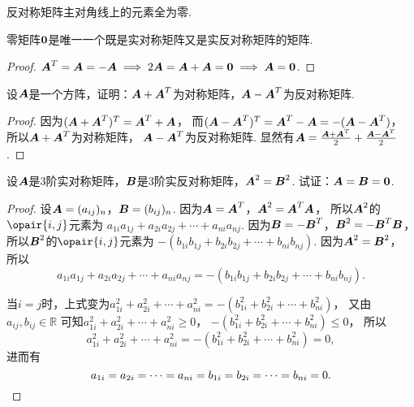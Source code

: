 \begin{property}
反对称矩阵主对角线上的元素全为零.
\end{property}

\begin{example}
零矩阵\(\boldsymbol0\)是唯一一个既是实对称矩阵又是实反对称矩阵的矩阵.
\begin{proof}
\(\boldsymbol{A}^T = \boldsymbol{A} = -\boldsymbol{A} \implies 2\boldsymbol{A} = \boldsymbol{A}+\boldsymbol{A} = \boldsymbol0 \implies \boldsymbol{A} = \boldsymbol0\).
\end{proof}
\end{example}

\begin{example}
设\(\boldsymbol{A}\)是一个方阵，证明：\(\boldsymbol{A}+\boldsymbol{A}^T\)为对称矩阵，\(\boldsymbol{A}-\boldsymbol{A}^T\)为反对称矩阵.
\begin{proof}
因为\((\boldsymbol{A}+\boldsymbol{A}^T)^T = \boldsymbol{A}^T+\boldsymbol{A}\)，
而\((\boldsymbol{A}-\boldsymbol{A}^T)^T = \boldsymbol{A}^T - \boldsymbol{A} = -(\boldsymbol{A}-\boldsymbol{A}^T)\)，
所以\(\boldsymbol{A}+\boldsymbol{A}^T\)为对称矩阵，
\(\boldsymbol{A}-\boldsymbol{A}^T\)为反对称矩阵.
显然有\(\boldsymbol{A} = \frac{\boldsymbol{A} + \boldsymbol{A}^T}{2} + \frac{\boldsymbol{A} - \boldsymbol{A}^T}{2}\).
\end{proof}
\end{example}

\begin{example}
设\(\boldsymbol{A}\)是3阶实对称矩阵，\(\boldsymbol{B}\)是3阶实反对称矩阵，\(\boldsymbol{A}^2 = \boldsymbol{B}^2\).
试证：\(\boldsymbol{A} = \boldsymbol{B} = \boldsymbol0\).
\begin{proof}
设\(\boldsymbol{A} = (a_{ij})_n\)，\(\boldsymbol{B} = (b_{ij})_n\).
因为\(\boldsymbol{A} = \boldsymbol{A}^T\)，\(\boldsymbol{A}^2 = \boldsymbol{A}^T \boldsymbol{A}\)，
所以\(\boldsymbol{A}^2\)的\(\opair{i,j}\)元素为
\(a_{1i} a_{1j} + a_{2i} a_{2j} + \dotsb + a_{ni} a_{nj}\).
因为\(\boldsymbol{B} = -\boldsymbol{B}^T\)，\(\boldsymbol{B}^2 = -\boldsymbol{B}^T \boldsymbol{B}\)，
所以\(\boldsymbol{B}^2\)的\(\opair{i,j}\)元素为
\(-(b_{1i} b_{1j} + b_{2i} b_{2j} + \dotsb + b_{ni} b_{nj})\).
因为\(\boldsymbol{A}^2 = \boldsymbol{B}^2\)，
所以\begin{equation*}
	a_{1i} a_{1j} + a_{2i} a_{2j} + \dotsb + a_{ni} a_{nj}
	= -(b_{1i} b_{1j} + b_{2i} b_{2j} + \dotsb + b_{ni} b_{nj}).
\end{equation*}

当\(i=j\)时，上式变为\(a_{1i}^2 + a_{2i}^2 + \dotsb + a_{ni}^2
= -(b_{1i}^2 + b_{2i}^2 + \dotsb + b_{ni}^2)\)，
又由\(a_{ij},b_{ij} \in \mathbb{R}\)
可知\(a_{1i}^2 + a_{2i}^2 + \dotsb + a_{ni}^2 \geq 0\)，
\(-(b_{1i}^2 + b_{2i}^2 + \dotsb + b_{ni}^2) \leq 0\)，
所以\begin{equation*}
	a_{1i}^2 + a_{2i}^2 + \dotsb + a_{ni}^2
	= -(b_{1i}^2 + b_{2i}^2 + \dotsb + b_{ni}^2) = 0,
\end{equation*}
进而有\begin{equation*}
	a_{1i} = a_{2i} = \dotsb = a_{ni} = b_{1i} = b_{2i} = \dotsb = b_{ni} = 0.
	\qedhere
\end{equation*}
\end{proof}
\end{example}

